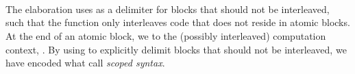 \begin{code}%
%
\>[10]\AgdaSpace{}%
\AgdaSymbol{:}\AgdaSpace{}%
\AgdaSpace{}%
\AgdaSpace{}%
\AgdaSymbol{:}\AgdaSpace{}%
\AgdaSpace{}%
\AgdaSpace{}%
\AgdaSpace{}%
\AgdaSpace{}%
\AgdaSpace{}%
\AgdaSpace{}%
\AgdaSpace{}%
\AgdaSpace{}%
\<%
\\
%
\>[10]\AgdaSpace{}%
\AgdaSpace{}%
\AgdaSymbol{(}\AgdaSpace{}%
\AgdaSpace{}%
\AgdaOperator{\AgdaInductiveConstructor{,}}\AgdaSpace{}%
\AgdaSpace{}%
\AgdaOperator{\AgdaInductiveConstructor{,}}\AgdaSpace{}%
\AgdaSymbol{)}%
\>[42]\AgdaSymbol{=}\<%
\\
\>[10][@{}l@{\AgdaIndent{0}}]%
\>[12]\AgdaSpace{}%
\AgdaSymbol{(}\AgdaSpace{}%
\AgdaSymbol{(}\AgdaSpace{}%
\AgdaSymbol{(}\AgdaSpace{}%
\AgdaSymbol{))}\AgdaSpace{}%
\AgdaSymbol{(}\AgdaSpace{}%
\AgdaSymbol{(}\AgdaSpace{}%
\AgdaSymbol{)))}\AgdaSpace{}%
\AgdaSpace{}%
\<%
\\
%
\>[10]\AgdaSpace{}%
\AgdaSpace{}%
\AgdaSymbol{(}\AgdaSpace{}%
\AgdaSpace{}%
\AgdaOperator{\AgdaInductiveConstructor{,}}\AgdaSpace{}%
\AgdaSpace{}%
\AgdaOperator{\AgdaInductiveConstructor{,}}\AgdaSpace{}%
\AgdaSymbol{)}%
\>[43]\AgdaSymbol{=}\AgdaSpace{}%
\AgdaSpace{}%
\AgdaSpace{}%
\AgdaSpace{}%
\AgdaSpace{}%
\AgdaSpace{}%
\AgdaSpace{}%
\AgdaSpace{}%
\AgdaSpace{}%
\AgdaSymbol{)}\AgdaSpace{}%
\<%
\end{code}
%
The elaboration uses  as a delimiter for blocks that should not be interleaved, such that the  function only interleaves code that does not reside in atomic blocks.
At the end of an \ac{atomic} block, we  to the (possibly interleaved) computation context, .
By using  to explicitly delimit blocks that should not be interleaved, we have encoded what \citet[\S{}~7]{WuSH14} call \emph{scoped syntax}.

